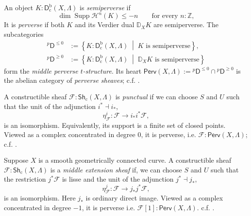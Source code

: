 \documentclass[11pt,letterpaper]{article}
\theoremstyle{numberfirstplain}
\numberwithin{equation}{theorem}
\theoremstyle{numberfirstupright}
\begin{document}
\begin{definition}\label{def:perverse-sheaf}
An object $K:\mathsf D_{\mathrm c}^{\mathrm b}(X,\Lambda)$ is \textit{semiperverse} if
\[
\dim\operatorname{Supp}\mathcal H^n(K)\le -n
\qquad\text{for every }n:\mathbb Z,
\]
It is \textit{perverse} if both $K$ and its Verdier dual $\mathbb D_XK$ are semiperverse.
The subcategories
\[
\begin{aligned}
{}^p\mathsf D^{\le0}
&:=\left\{K:\mathsf D_{\mathrm c}^{\mathrm b}(X,\Lambda)\;\middle|\;K\text{ is semiperverse}\right\},\\
{}^p\mathsf D^{\ge0}
&:=\left\{K:\mathsf D_{\mathrm c}^{\mathrm b}(X,\Lambda)\;\middle|\;\mathbb D_XK\text{ is semiperverse}\right\}
\end{aligned}
\]
form the \textit{middle perverse $t$-structure}. Its heart
$
\mathsf{Perv}(X,\Lambda):={}^p\mathsf D^{\le0}\cap{}^p\mathsf D^{\ge0}
$
is the abelian category of \textit{perverse sheaves}; c.f. \cite[\S2.3.1 and \S2.3.1.1]{Katz1996}.
\end{definition}

\begin{example}\label{def:punctual-sheaf}
A constructible sheaf $\mathcal F:\mathsf{Sh}_{\mathrm c}(X,\Lambda)$ is \textit{punctual} if we can choose $S$ and $U$ such that the unit of the adjunction $i^*\dashv i_*$,
\[
\eta^i_{\mathcal F}:\mathcal F\longrightarrow i_*i^*\mathcal F,
\]
is an isomorphism. Equivalently, its support is a finite set of closed points.
Viewed as a complex concentrated in degree $0$, it is perverse, i.e. $\mathcal F:\mathsf{Perv}(X,\Lambda)$; c.f. \cite[\S2.3.6]{Katz1996}.
\end{example}

\begin{example}\label{def:middle-extension-sheaf}
Suppose $X$ is a smooth geometrically connected curve.
A constructible sheaf $\mathcal F:\mathsf{Sh}_{\mathrm c}(X,\Lambda)$ is a \textit{middle extension sheaf} if, we can choose $S$ and $U$ such that the restriction $j^*\mathcal F$ is lisse and the unit of the adjunction $j^*\dashv j_*$,
\[
\eta^j_{\mathcal F}:\mathcal F\longrightarrow j_*j^*\mathcal F,
\]
is an isomorphism. Here $j_*$ is ordinary direct image.
Viewed as a complex concentrated in degree $-1$, it is perverse i.e. 
$
\mathcal F[1]:\mathsf{Perv}(X,\Lambda).
$ 
c.f. \cite[\S2.0.3 and \S2.3.6]{Katz1996}.
\end{example}
\end{document}
